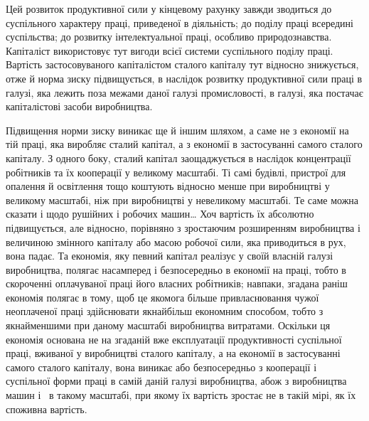 \parcont{}  %
Цей розвиток продуктивної сили у кінцевому рахунку завжди
зводиться до суспільного характеру праці, приведеної в діяльність;
до поділу праці всередині суспільства; до розвитку інтелектуальної
праці, особливо природознавства. Капіталіст використовує
тут вигоди всієї системи суспільного поділу праці.
Вартість застосовуваного капіталістом сталого капіталу тут
відносно знижується, отже й норма зиску підвищується, в наслідок
розвитку продуктивної сили праці в галузі, яка лежить
поза межами даної галузі промисловості, в галузі, яка постачає
капіталістові засоби виробництва.

Підвищення норми зиску виникає ще й іншим шляхом, а саме
не з економії на тій праці, яка виробляє сталий капітал, а з економії
в застосуванні самого сталого капіталу. З одного боку,
сталий капітал заощаджується в наслідок концентрації робітників
та їх кооперації у великому масштабі. Ті самі будівлі, пристрої
для опалення й освітлення тощо коштують відносно
менше при виробництві у великому масштабі, ніж при виробництві
у невеликому масштабі. Те саме можна сказати і щодо
рушійних і робочих машин\dots{} Хоч вартість їх абсолютно підвищується,
але відносно, порівняно з зростаючим розширенням
виробництва і величиною змінного капіталу або масою робочої
сили, яка приводиться в рух, вона падає. Та економія, яку певний
капітал реалізує у своїй власній галузі виробництва, полягає
насамперед і безпосередньо в економії на праці, тобто в скороченні
оплачуваної праці його власних робітників; навпаки, згадана
раніш економія полягає в тому, щоб це якомога більше привласнювання
чужої неоплаченої праці здійснювати якнайбільш економним
способом, тобто з якнайменшими при даному масштабі
виробництва витратами. Оскільки ця економія основана не
на згаданій вже експлуатації продуктивності суспільної праці,
вживаної у виробництві сталого капіталу, а на економії в застосуванні
самого сталого капіталу, вона виникає або безпосередньо
з кооперації і суспільної форми праці в самій даній галузі виробництва,
абож з виробництва машин і~ в такому масштабі,
при якому їх вартість зростає не в такій мірі, як їх споживна
вартість.

